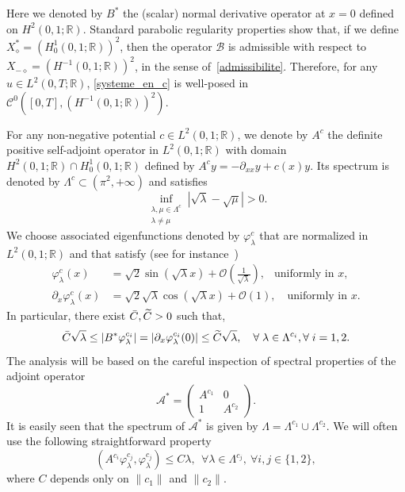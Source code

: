 \documentclass[AHL,Unicode,longabstracts]{cedram}
\newcommand{\fprop}[2]{\varphi^{#1}_{#2}}
\newcommand\As{\mathcal{A}^*}
\newcommand\B{\mathcal{B}}
\newcommand{\Xalphas}{X_\diamond^*}
\newcommand{\Xmalpha}{X_{-\diamond}}
\newcommand{\CC}{\mathcal{C}}
\newcommand{\R}{\mathbb{R}}
\let\oldtilde\tilde
\renewcommand*{\tilde}[1]{\mathchoice{\widetilde{#1}}{\widetilde{#1}}{\oldtilde{#1}}{\oldtilde{#1}}}\let\oldexists\exists
\renewcommand*{\exists}{\mathrel{\oldexists}}
\let\oldforall\forall
\renewcommand*{\forall}{\mathrel{\oldforall}}
\begin{document}
Here we denoted by $B^*$ the (scalar) normal derivative operator at $x=0$ defined on $H^2(0,1 ; \R)$. Standard parabolic regularity properties show that, if we define $\Xalphas=(H^1_0(0,1 ; \R))^2$, then the operator $\B$ is admissible with respect to\linebreak$\Xmalpha=(H^{-1}(0,1;\R))^2$, in the sense of~\eqref{admissibilite}. Therefore, for any $u\in L^2(0,T;\R)$, \eqref{systeme_en_c} is well-posed in $\CC^0([0,T],(H^{-1}(0,1 ; \R))^2)$.


For any non-negative potential $c\in L^2(0,1 ; \R)$, we denote by $A^c$ the definite positive self-adjoint operator in $L^2(0,1 ; \R)$ with domain $H^2(0,1 ; \R)\cap H^1_0(0,1 ; \R)$ defined by $A^c y=-\partial_{xx} y + c(x) y$. Its spectrum is denoted by $\Lambda^c\subset (\pi^2,+\infty)$ and satisfies
\begin{equation}\label{Asymptotique_Lambda_new}
\inf_{\substack{\lambda,\mu \in \Lambda^c\\ \lambda\neq\mu}} \left|\sqrt{\lambda}-\sqrt{\mu}\right| > 0.
\end{equation}
We choose associated eigenfunctions denoted by $\fprop{c}{\lambda}$ that are normalized in $L^2(0,1 ; \R)$ and that satisfy (see for instance~\cite[Theorem~4.11]{KirschBook})
\begin{align}
\fprop{c}{\lambda}(x) &= \sqrt{2}\sin(\sqrt{\lambda}x) + \mathcal{O}\left(\frac{1}{\sqrt{\lambda}} \right), \;\;\: \text{uniformly in }x,\label{Asymptotique_varphi_new}
\\
\partial_x \fprop{c}{\lambda}(x) &= \sqrt{2}\sqrt{\lambda} \cos(\sqrt{\lambda}x) + \mathcal{O}\left(1 \right), \quad \text{uniformly in }x.\label{Asymptotique_varphi'_new}
\end{align}
In particular, there exist $\bar{C},\tilde{C}>0$ such that,
\begin{equation}\label{observation_Ac}
\bar{C}\sqrt{\lambda} \leq \left|B^* \fprop{c_i}{\lambda}\right| = \left|\partial_x \fprop{c_i}{\lambda}(0)\right|\leq \tilde{C} \sqrt{\lambda}, \quad \forall \lambda\in \Lambda^{c_i}, \forall i=1,2.
\end{equation}
The analysis will be based on the careful inspection of spectral properties of the adjoint operator
\[
\As=
\begin{pmatrix}
A^{c_1}&0
\\
1 & A^{c_2}
\end{pmatrix}.
\]
It is easily seen that the spectrum of $\As$ is given by $\Lambda=\Lambda^{c_1}\cup \Lambda^{c_2}$. We will often use the following straightforward property
\begin{equation}\label{borne_H1_fprop}
(A^{c_i}\fprop{c_j}{\lambda},\fprop{c_j}{\lambda}) \leq C \lambda, \ \ \forall \lambda\in \Lambda^{c_j}, \ \forall i,j\in \{1,2\},
\end{equation}
where $C$ depends only on $\|c_1\|$ and $\|c_2\|$.
\end{document}

